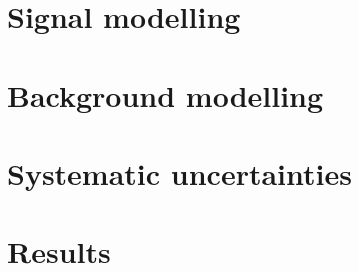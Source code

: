 \section{Signal modelling}

\section{Background modelling}

\section{Systematic uncertainties}

\section{Results}


